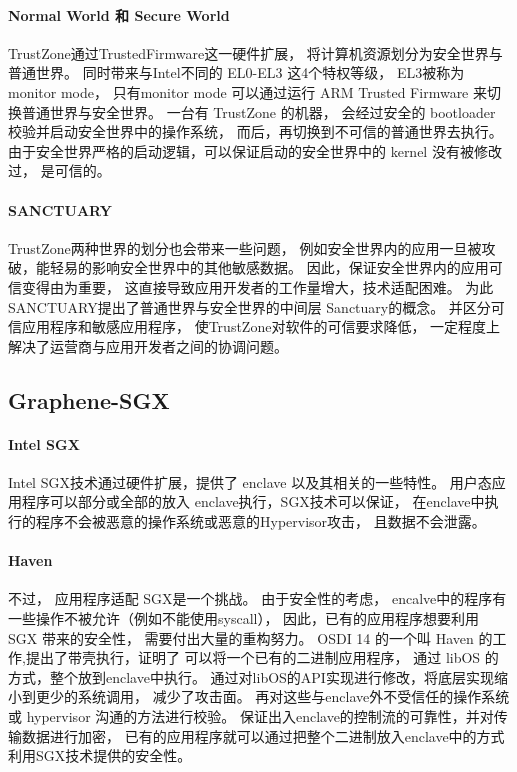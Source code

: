 \paragraph{Normal World 和 Secure World}TrustZone\cite{trustZone-p1}通过TrustedFirmware这一硬件扩展，
将计算机资源划分为安全世界与普通世界。
同时带来与Intel不同的 EL0-EL3 这4个特权等级，
EL3被称为 monitor mode\cite{trustZone-p3}，
只有monitor mode 可以通过运行 ARM Trusted Firmware 来切换普通世界与安全世界。
一台有 TrustZone 的机器，
会经过安全的 bootloader 校验并启动安全世界中的操作系统\cite{trustZone-p2}，
而后，再切换到不可信的普通世界去执行。
由于安全世界严格的启动逻辑，可以保证启动的安全世界中的 kernel 没有被修改过，
是可信的。
\paragraph{SANCTUARY}TrustZone两种世界的划分也会带来一些问题，
例如安全世界内的应用一旦被攻破，能轻易的影响安全世界中的其他敏感数据\cite{sanctuary-p2}。
因此，保证安全世界内的应用可信变得由为重要，
这直接导致应用开发者的工作量增大，技术适配困难。
为此SANCTUARY\cite{sanctuary-p1}提出了普通世界与安全世界的中间层 Sanctuary的概念。
并区分可信应用程序和敏感应用程序，
使TrustZone对软件的可信要求降低，
一定程度上解决了运营商与应用开发者之间的协调问题。

\subsection{Graphene-SGX}
\paragraph{Intel SGX}Intel SGX技术通过硬件扩展，提供了 enclave 以及其相关的一些特性。
用户态应用程序可以部分或全部的放入 enclave执行，SGX技术可以保证，
在enclave中执行的程序不会被恶意的操作系统或恶意的Hypervisor攻击，
且数据不会泄露。
\paragraph{Haven}不过，
应用程序适配 SGX是一个挑战。
由于安全性的考虑，
encalve中的程序有一些操作不被允许（例如不能使用syscall），
因此，已有的应用程序想要利用 SGX 带来的安全性，
需要付出大量的重构努力。
OSDI 14 的一个叫 Haven \cite{Haven} 的工作,提出了带壳执行，证明了
可以将一个已有的二进制应用程序，
通过 libOS \cite{libos}的方式，整个放到enclave中执行。
通过对libOS的API实现进行修改，将底层实现缩小到更少的系统调用，
减少了攻击面。
再对这些与enclave外不受信任的操作系统或 hypervisor 沟通的方法进行校验。
保证出入enclave的控制流的可靠性，并对传输数据进行加密，
已有的应用程序就可以通过把整个二进制放入enclave中的方式利用SGX技术提供的安全性。
